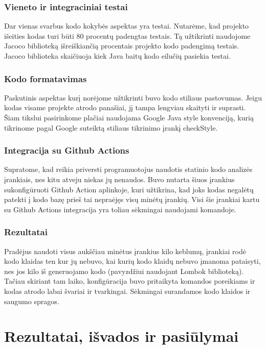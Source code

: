 \documentclass{VUMIFPSkursinis}
\begin{document}
		\subsubsection{Vieneto ir integraciniai testai}
			Dar vienas svarbus kodo kokybės aspektas yra testai.
			Nutarėme, kad projekto išeities kodas turi būti 80 procentų padengtas testais.
			Tą užtikrinti naudojome Jacoco biblioteką išreiškiančią procentais projekto kodo padengimą testais.
			Jacoco biblioteka skaičiuoja kiek Java baitų kodo eilučių pasiekia testai.
		\subsubsection{Kodo formatavimas}
			Paskutinis aspektas kurį norėjome užtikrinti buvo kodo stiliaus pastovumas.
			Jeigu kodas visame projekte atrodo panašiai, jį tampa lengviau skaityti ir suprasti.
			Šiam tikslui pasirinkome plačiai naudojama Google Java style konvenciją, kurią tikrinome pagal Google suteiktą stiliaus tikrinimo įrankį checkStyle. 
		\subsubsection{Integracija su Github Actions}
			Supratome, kad reikia priversti programuotojus naudotis statinio kodo analizės įrankiais, nes kitu atveju niekas jų nenaudos.
			Buvo nutarta šiuos įrankius sukonfigūruoti Github Action aplinkoje, kuri užtikrina, kad joks kodas negalėtų patekti į kodo bazę prieš tai nepraėjęs visų minėtų įrankių.
			Visi šie įrankiai kartu su Github Actions integracija yra toliau sėkmingai naudojami komandoje.
		\subsubsection{Rezultatai}
			Pradėjus naudoti visus aukščiau minėtus įrankius kilo keblumų, įrankiai rodė kodo klaidas ten kur jų nebuvo, kai kurių kodo klaidų
			nebuvo įmanoma pataisyti, nes jos kilo iš generuojamo kodo (pavyzdžiui  naudojant Lombok biblioteką).
			Tačiau skiriant tam laiko, konfigūracija buvo pritaikyta komandos poreikiams ir kodas atrodo labai švariai ir tvarkingai.
			Sėkmingai surandamos kodo klaidos ir saugumo spragos.

		
\section{Rezultatai, išvados ir pasiūlymai}
\end{document}
